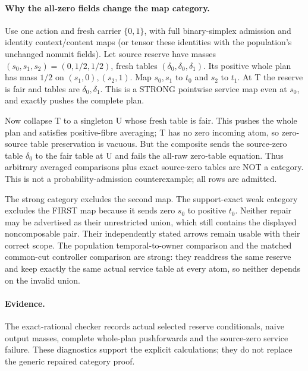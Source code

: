 \documentclass{article}\usepackage{amsmath,amssymb}
\begin{document}
\paragraph{Why the all-zero fields change the map category.}
Use one action and fresh carrier $\{0,1\}$, with full binary-simplex admission and identity context/content maps (or tensor these identities with the population's unchanged nonunit fields). Let source reserve have masses $(s_0,s_1,s_2)=(0,1/2,1/2)$, fresh tables $(\delta_0,\delta_0,\delta_1)$. Its positive whole plan has mass $1/2$ on $(s_1,0),(s_2,1)$. Map $s_0,s_1$ to $t_0$ and $s_2$ to $t_1$. At T the reserve is fair and tables are $\delta_0,\delta_1$. This is a STRONG pointwise service map even at $s_0$, and exactly pushes the complete plan.

Now collapse T to a singleton U whose fresh table is fair. This pushes the whole plan and satisfies positive-fibre averaging; T has no zero incoming atom, so zero-source table preservation is vacuous. But the composite sends the source-zero table $\delta_0$ to the fair table at U and fails the all-raw zero-table equation. Thus arbitrary averaged comparisons plus exact source-zero tables are NOT a category. This is not a probability-admission counterexample; all rows are admitted.

The strong category excludes the second map. The support-exact weak category excludes the FIRST map because it sends zero $s_0$ to positive $t_0$. Neither repair may be advertised as their unrestricted union, which still contains the displayed noncomposable pair. Their independently stated arrows remain usable with their correct scope. The population temporal-to-owner comparison and the matched common-cut controller comparison are strong: they readdress the same reserve and keep exactly the same actual service table at every atom, so neither depends on the invalid union.

\paragraph{Evidence.} The exact-rational checker records actual selected reserve conditionals, naive output masses, complete whole-plan pushforwards and the source-zero service failure. These diagnostics support the explicit calculations; they do not replace the generic repaired category proof.
\end{document}
